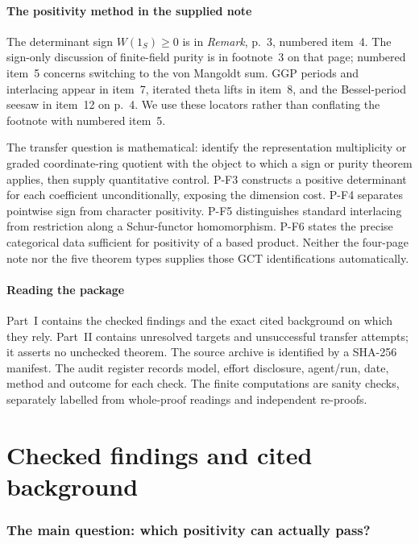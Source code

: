 \documentclass[11pt,a4paper]{article}
\begin{document}
\subsection*{The positivity method in the supplied note}
The determinant sign $W(1_S)\ge0$ is in \emph{Remark}, p.~3, numbered
item~4. The sign-only discussion of finite-field purity is in footnote~3
on that page; numbered item~5 concerns switching to the von Mangoldt
sum. GGP periods and interlacing appear in item~7, iterated theta lifts in
item~8, and the Bessel-period seesaw in item~12 on p.~4. We use these
locators rather than conflating the footnote with numbered item~5.

The transfer question is mathematical: identify the representation
multiplicity or graded coordinate-ring quotient with the object to which
a sign or purity theorem applies, then supply quantitative control.
P-F3 constructs a positive determinant for each coefficient
unconditionally, exposing the dimension cost. P-F4 separates pointwise
sign from character positivity. P-F5 distinguishes standard interlacing
from restriction along a Schur-functor homomorphism. P-F6 states the
precise categorical data sufficient for positivity of a based product.
Neither the four-page note nor the five theorem types supplies those GCT
identifications automatically.

\subsection*{Reading the package}
Part~I contains the checked findings and the exact cited background on
which they rely. Part~II contains unresolved targets and unsuccessful
transfer attempts; it asserts no unchecked theorem. The source archive
is identified by a SHA-256 manifest. The audit register records model,
effort disclosure, agent/run, date, method and outcome for each check.
The finite computations are sanity checks, separately labelled from
whole-proof readings and independent re-proofs.


\clearpage\part{Checked findings and cited background}

\section{The main question: which positivity can actually pass?}
\label{sec:positivity}
\end{document}
